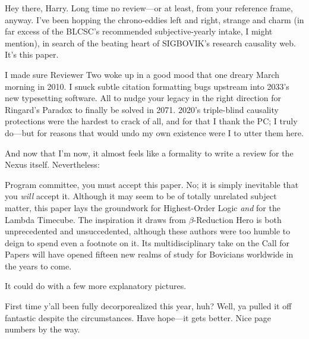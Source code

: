 \documentclass[12pt]{sigbovik-review}
\author{Dos Sleddins, Time Detective}
\begin{document}
\maketitle

\vspace{-12pt}
Hey there, Harry. Long time no review---or at least, from your reference frame, anyway.
I've been hopping the chrono-eddies left and right, strange and charm
(in far excess of the BLCSC's recommended subjective-yearly intake, I might mention),
in search of the beating heart of SIGBOVIK's research causality web.
It's this paper.

I made sure Reviewer Two woke up in a good mood that one dreary March morning in 2010.
I snuck subtle citation formatting bugs upstream into 2033's new typesetting software.
All to nudge your legacy in the right direction
for Ringard's Paradox to finally be solved in 2071.
2020's triple-blind causality protections were the hardest to crack of all,
and for that I thank the PC; I truly do---but for reasons that would undo my own existence were I to utter them here.

And now that I'm now,
it almost feels like a formality to write a review for the Nexus itself.
Nevertheless:

Program committee, you must accept this paper.
No; it is simply inevitable that you {\it will} accept it.
Although it may seem to be of totally unrelated subject matter,
this paper lays the groundwork for
Highest-Order Logic
{\it and} for
the Lambda Timecube.
The inspiration it draws from $\beta$-Reduction Hero
is both unprecedented and unsuccedented,
although these authors were too humble to deign to spend even a footnote on it.
Its multidisciplinary take on the Call for Papers
will have opened fifteen new realms of study for Bovicians worldwide
in the years to come.

It could do with a few more explanatory pictures.

First time y'all been fully decorporealized this year, huh?
Well, ya pulled it off fantastic despite the circumstances.
Have hope---it gets better. Nice page numbers by the way.
\end{document}
